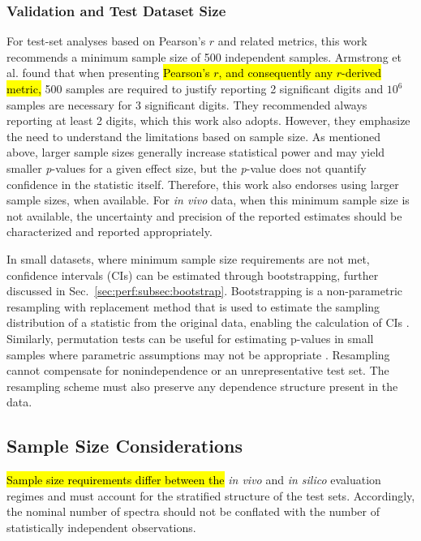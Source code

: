 \subsubsection{Validation and Test Dataset Size}
\label{sec:dataModel:subsec:data requirements:subsubsec:test set size}
For test-set analyses based on Pearson's $r$ and related metrics, this work recommends a minimum sample size of 500 independent samples. Armstrong et al. \cite{Armstrong2019} found that when presenting \hl{Pearson's $r$, and consequently any $r$-derived metric,} 500 samples are required to justify reporting 2 significant digits and $10^6$ samples are necessary for 3 significant digits. They recommended always reporting at least 2 digits, which this work also adopts. However, they emphasize the need to understand the limitations based on sample size. As mentioned above, larger sample sizes generally increase statistical power and may yield smaller \textit{p}-values for a given effect size, but the \textit{p}-value does not quantify confidence in the statistic itself. Therefore, this work also endorses using larger sample sizes, when available. For \textit{in vivo} data, when this minimum sample size is not available, the uncertainty and precision of the reported estimates should be characterized and reported appropriately. 

In small datasets, where minimum sample size requirements are not met, confidence intervals (CIs) can be estimated through bootstrapping, further discussed in Sec.~\ref{sec:perf:subsec:bootstrap}. Bootstrapping is a non-parametric resampling with replacement method that is used to estimate the sampling distribution of a statistic from the original data, enabling the calculation of CIs \cite{Haukoos2005, Good2005}. Similarly, permutation tests can be useful for estimating p-values in small samples where parametric assumptions may not be appropriate \cite{Good2005}. Resampling cannot compensate for nonindependence or an unrepresentative test set. The resampling scheme must also preserve any dependence structure present in the data.

\subsection{Sample Size Considerations}
\label{sec:Reg:subsec:comparison:subsubsec:samplesize}
\hl{Sample size requirements differ between the }\emph{in vivo} and \emph{in silico} evaluation regimes and must account for the stratified structure of the test sets. Accordingly, the nominal number of spectra should not be conflated with the number of statistically independent observations.

